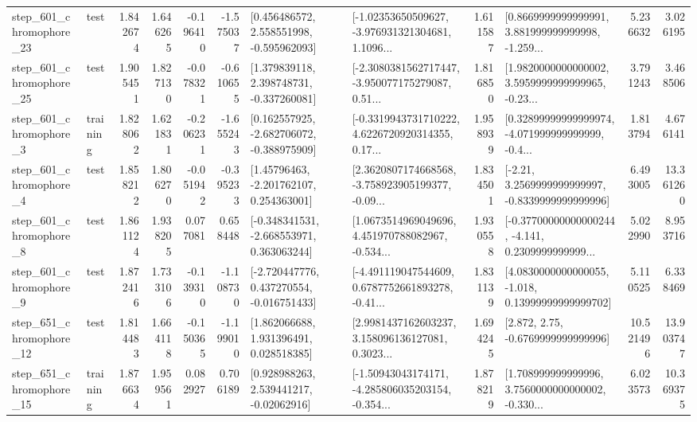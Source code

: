 \begin{tabular}{llrrrrllrlrr}
  step\_601\_chromophore\_23 &      test &      1.842674 &    1.646265 &     -0.196410 & -1.575037 &    [0.456486572, 2.558551998, -0.595962093] &  [-1.02353650509627, -3.976931321304681, 1.1096... &       1.611587 &  [0.8669999999999991, 3.881999999999998, -1.259... &            5.236632 &          3.026195 \\
  step\_601\_chromophore\_25 &      test &      1.905451 &    1.827130 &     -0.078321 & -0.610655 &    [1.379839118, 2.398748731, -0.337260081] &  [-2.3080381562717447, -3.950077175279087, 0.51... &       1.816850 &  [1.9820000000000002, 3.5959999999999965, -0.23... &            3.791243 &          3.468506 \\
   step\_601\_chromophore\_3 &  training &      1.828062 &    1.621831 &     -0.206231 & -1.655243 &   [0.162557925, -2.682706072, -0.388975909] &  [-0.3319943731710222, 4.6226720920314355, 0.17... &       1.958939 &  [0.32899999999999974, -4.071999999999999, -0.4... &            1.813794 &          4.676141 \\
   step\_601\_chromophore\_4 &      test &      1.858212 &    1.806270 &     -0.051942 & -0.395233 &     [1.45796463, -2.201762107, 0.254363001] &  [2.3620807174668568, -3.758923905199377, -0.09... &       1.834501 &   [-2.21, 3.2569999999999997, -0.8339999999999996] &            6.493005 &         13.361260 \\
   step\_601\_chromophore\_8 &      test &      1.861124 &    1.938205 &      0.077081 &  0.658448 &   [-0.348341531, -2.668553971, 0.363063244] &  [1.0673514969049696, 4.451970788082967, -0.534... &       1.930558 &  [-0.37700000000000244, -4.141, 0.2309999999999... &            5.022990 &          8.953716 \\
   step\_601\_chromophore\_9 &      test &      1.872416 &    1.733106 &     -0.139310 & -1.108730 &   [-2.720447776, 0.437270554, -0.016751433] &  [-4.491119047544609, 0.6787752661893278, -0.41... &       1.831139 &  [4.0830000000000055, -1.018, 0.13999999999999702] &            5.110525 &          6.338469 \\
  step\_651\_chromophore\_12 &      test &      1.814483 &    1.664118 &     -0.150365 & -1.199010 &     [1.862066688, 1.931396491, 0.028518385] &  [2.9981437162603237, 3.158096136127081, 0.3023... &       1.694245 &                 [2.872, 2.75, -0.6769999999999996] &           10.521496 &         13.903747 \\
  step\_651\_chromophore\_15 &  training &      1.876634 &    1.959561 &      0.082927 &  0.706189 &     [0.928988263, 2.539441217, -0.02062916] &  [-1.50943043174171, -4.285806035203154, -0.354... &       1.878219 &  [1.708999999999996, 3.7560000000000002, -0.330... &            6.023573 &         10.369375 \\

\end{tabular}
